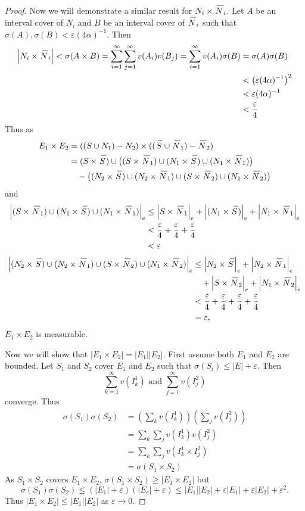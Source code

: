 \documentclass[12pt]{book}
\renewcommand{\u}{\cup}
\newcommand{\inv}{^{-1}}
\newcommand{\cross}{\times}
\newcommand{\tand}{\text{ and }}
\renewcommand{\.}{\mkern1mu}
\newcommand{\e}{\varepsilon}
\newcommand{\abs}[1]{\left| #1 \right|}
\newcommand{\lr}[1]{\left(#1\right)}
\newenvironment{pf}{\begin{proof}\setlength{\parindent}{\normalparindent}\setlength{\parskip}{\normalparskip}}{\end{proof}}
\theoremstyle{theorem}
\renewcommand{\bar}[1]{\overset{\hspace{3pt}\rule[0.5pt]{\widthof{#1}}  
	{0.1ex}}{#1}}
\newcommand{\mes}[1]{\abs{#1}}
\newcommand{\omes}[1]{\mes{#1}_e}
\newlength{\normalparindent}
\newlength{\normalparskip}
\begin{document}
\begin{pf}
	Now we will demonstrate a similar result for $N_i \cross \bar{N}_i$. Let $A$ be an interval cover of $N_i$ and $B$ be an interval cover of $\bar{N}_i$ such that $\sigma(A), \sigma(B) < \e(4\alpha)\inv$. Then
		\begin{align*}
		\mes{N_i \cross \bar{N}_i} < \sigma(A \cross B) = \sum_{i=1}^\infty \sum _{j=1}^\infty v(A_i)v(B_j) = \sum_{i=1}^\infty v(A_i) \sigma(B)
		&= \sigma(A)\sigma(B)\\
			& < \lr{\e(4\alpha)\inv}^2\\
			& < \e(4\alpha)\inv\\
			& < \frac{\e}{4} 
		\end{align*}
	Thus as
	\begin{align*}
		E_1 \cross E_2 &= ((S\u N_1) - N_2) \cross ((\bar{S}\u \bar{N}_1) - \bar{N}_2)\\
			&= (S\cross \bar{S}) \u \big((S\cross\bar{N}_1)\u(N_1\cross\bar{S})\u (N_1\cross\bar{N}_1)\big)\\
			& \quad - \big((N_2\cross\bar{S})\u(N_2\cross\bar{N}_1)\u(S\cross\bar{N}_2)\u(N_1\cross\bar{N}_2)\big)\\
		\end{align*}
	and 
		\begin{align*}
		\omes{(S\cross\bar{N}_1)\u(N_1\cross\bar{S})\u (N_1\cross\bar{N}_1)} 
		&\leq \omes{S\cross\bar{N}_1} + \omes{(N_1 \cross \bar{S})} + \omes{N_1\cross \bar{N}_1}\\
			& < \frac{\e}{4} + \frac{\e}{4} + \frac{\e}{4}\\
			& < \e
		\end{align*}
		\begin{align*}
		\omes{(N_2\cross\bar{S})\u(N_2\cross\bar{N}_1)\u(S\cross\bar{N}_2)\u(N_1\cross\bar{N}_2)} & \leq \omes{N_2\cross\bar{S}}+ \omes{N_2\cross\bar{N}_1}\\
			&\quad + \omes{S\cross\bar{N}_2} + \omes{N_1\cross\bar{N}_2}\\
			&< \frac{\e}{4} + \frac{\e}{4} + \frac{\e}{4} + \frac{\e}{4}\\
			&= \e,
		\end{align*}
	$E_1 \cross E_2$ is measurable.
	
	Now we will show that $\mes{E_1 \cross E_2} = \mes{E_1}\mes{E_2}$. First assume both $E_1$ and $E_2$ are bounded. Let $S_1$ and $S_2$ cover $E_1$ and $E_2$ such that $\sigma(S_i) \leq \mes{E} + \e$. Then 
		\[ \sum_{k=1}^\infty v(I_k^1) \tand \sum_{j=1}^\infty v(I_j^2) \]
	converge. Thus 
		\begin{align*}
		\sigma(S_1)\sigma(S_2) &= \lr{\sum_k v(I_k^1)}\lr{\sum_j v(I_j^2)}\\
			&= \sum_k \sum_j v(I_k^1)v(I_j^2)\\
			&= \sum_k \sum_j v(I_k^1 \cross I_j^2)\\
			&= \sigma(S_1 \cross S_2)
		\end{align*}
	As $S_1 \cross S_2$ covers $E_1\cross E_2$, $\sigma(S_1\cross S_2) \geq \mes{E_1\cross E_2}$ but
			\[\sigma(S_1)\sigma(S_2) \leq \lr{\mes{E_1}+\e}\lr{\mes{E_e}+\e} \leq \mes{E_1}\mes{E_2} +\e\mes{E_1} +\e\mes{E_2} +\e^2. \]
		Thus $\mes{E_1\cross E_2} \leq \mes{E_1}\mes{E_2}$ as $\e \to 0$.
		

\end{pf}
\end{document}
